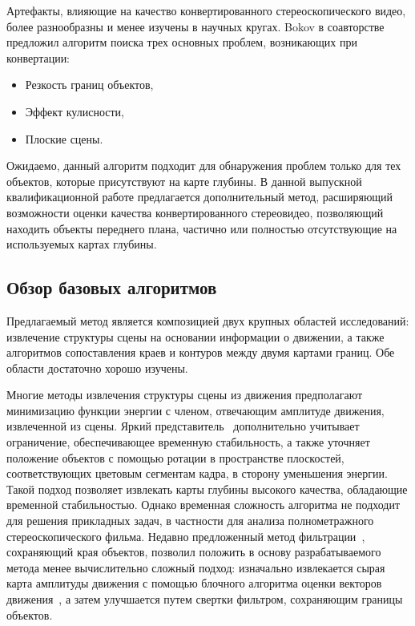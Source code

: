 \documentclass[14pt, a4paper]{extarticle}
\begin{document}
Артефакты, влияющие на качество конвертированного стереоскопического видео, более 
разнообразны и менее изучены в научных кругах. Bokov в соавторстве~\cite{bokov2014automatic} 
предложил алгоритм поиска трех основных проблем, возникающих при конвертации:
\begin{itemize}
	\item Резкость границ объектов,
	\item Эффект кулисности,
	\item Плоские сцены.
\end{itemize}
Ожидаемо, данный алгоритм подходит для обнаружения проблем только для тех объектов, 
которые присутствуют на карте глубины. В данной выпускной
квалификационной работе предлагается 
дополнительный метод, расширяющий возможности оценки качества конвертированного стереовидео,
позволяющий находить объекты переднего плана, частично или полностью отсутствующие
на используемых картах глубины.

\subsection{Обзор базовых алгоритмов}

Предлагаемый метод является композицией двух крупных областей исследований: извлечение структуры 
сцены на основании информации о движении, а также алгоритмов сопоставления краев и контуров 
между двумя картами границ. Обе области достаточно хорошо изучены.

Многие методы извлечения структуры сцены из движения предполагают минимизацию функции энергии
с членом, отвечающим амплитуде движения, извлеченной из сцены. Яркий 
представитель~\cite{zhang2009consistent} дополнительно учитывает ограничение, 
обеспечивающее временную стабильность, а также уточняет положение объектов с помощью ротации 
в пространстве плоскостей, соответствующих цветовым сегментам кадра, в сторону уменьшения энергии.
Такой подход позволяет извлекать карты глубины высокого качества, обладающие временной стабильностью.
Однако временная сложность алгоритма не подходит для решения прикладных задач, в частности 
для анализа полнометражного стереоскопического фильма. Недавно предложенный метод
фильтрации~\cite{he2013guided}, сохраняющий края объектов, позволил положить в основу разрабатываемого
метода менее вычислительно сложный подход: изначально извлекается сырая карта амплитуды движения 
с помощью блочного алгоритма оценки векторов движения~\cite{simonyan2008fast}, а затем улучшается
путем свертки фильтром, сохраняющим границы объектов.
\end{document}
